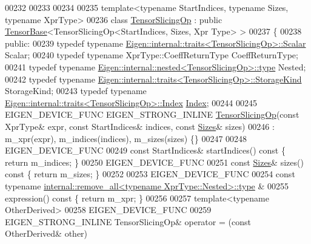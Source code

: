 \begin{DoxyCode}
00232 
00233 
00234 
00235 \textcolor{keyword}{template}<\textcolor{keyword}{typename} StartIndices, \textcolor{keyword}{typename} Sizes, \textcolor{keyword}{typename} XprType>
00236 \textcolor{keyword}{class }\hyperlink{class_eigen_1_1_tensor_slicing_op}{TensorSlicingOp} : \textcolor{keyword}{public} \hyperlink{class_eigen_1_1_tensor_base}{TensorBase}<TensorSlicingOp<StartIndices, Sizes, Xpr
      Type> >
00237 \{
00238   \textcolor{keyword}{public}:
00239   \textcolor{keyword}{typedef} \textcolor{keyword}{typename} \hyperlink{struct_eigen_1_1internal_1_1traits}{Eigen::internal::traits<TensorSlicingOp>::Scalar}
       Scalar;
00240   \textcolor{keyword}{typedef} \textcolor{keyword}{typename} XprType::CoeffReturnType CoeffReturnType;
00241   \textcolor{keyword}{typedef} \textcolor{keyword}{typename} \hyperlink{class_eigen_1_1internal_1_1_tensor_lazy_evaluator_writable}{Eigen::internal::nested<TensorSlicingOp>::type}
       Nested;
00242   \textcolor{keyword}{typedef} \textcolor{keyword}{typename} \hyperlink{struct_eigen_1_1internal_1_1traits}{Eigen::internal::traits<TensorSlicingOp>::StorageKind}
       StorageKind;
00243   \textcolor{keyword}{typedef} \textcolor{keyword}{typename} \hyperlink{struct_eigen_1_1internal_1_1traits}{Eigen::internal::traits<TensorSlicingOp>::Index}
       \hyperlink{namespace_eigen_a62e77e0933482dafde8fe197d9a2cfde}{Index};
00244 
00245   EIGEN\_DEVICE\_FUNC EIGEN\_STRONG\_INLINE \hyperlink{class_eigen_1_1_tensor_slicing_op}{TensorSlicingOp}(\textcolor{keyword}{const} XprType& expr, \textcolor{keyword}{const} 
      StartIndices& indices, \textcolor{keyword}{const} \hyperlink{struct_eigen_1_1_sizes}{Sizes}& sizes)
00246       : m\_xpr(expr), m\_indices(indices), m\_sizes(sizes) \{\}
00247 
00248     EIGEN\_DEVICE\_FUNC
00249     \textcolor{keyword}{const} StartIndices& startIndices()\textcolor{keyword}{ const }\{ \textcolor{keywordflow}{return} m\_indices; \}
00250     EIGEN\_DEVICE\_FUNC
00251     \textcolor{keyword}{const} \hyperlink{struct_eigen_1_1_sizes}{Sizes}& sizes()\textcolor{keyword}{ const }\{ \textcolor{keywordflow}{return} m\_sizes; \}
00252 
00253     EIGEN\_DEVICE\_FUNC
00254     \textcolor{keyword}{const} \textcolor{keyword}{typename} \hyperlink{group___sparse_core___module}{internal::remove\_all<typename XprType::Nested>::type}
      &
00255     expression()\textcolor{keyword}{ const }\{ \textcolor{keywordflow}{return} m\_xpr; \}
00256 
00257     \textcolor{keyword}{template}<\textcolor{keyword}{typename} OtherDerived>
00258     EIGEN\_DEVICE\_FUNC
00259     EIGEN\_STRONG\_INLINE TensorSlicingOp& operator = (\textcolor{keyword}{const} OtherDerived& other)

\end{DoxyCode}
